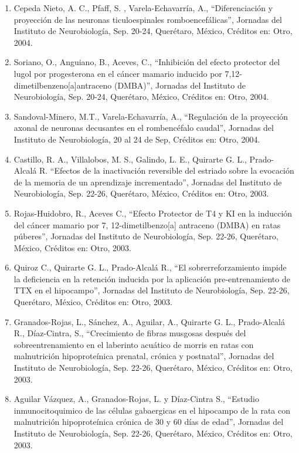 \begin{enumerate}
\item Cepeda Nieto, A. C., Pfaff, S. , Varela-Echavarría, A., “Diferenciación y proyección de las neuronas ticuloespinales romboencefálicas”, 
Jornadas del Instituto de Neurobiología, Sep. 20-24, Querétaro, México, Créditos en: Otro, 2004.

\item Soriano, O., Anguiano, B., Aceves, C., “Inhibición del efecto protector del lugol por progesterona en el cáncer mamario inducido por 
7,12-dimetilbenzeno[a]antraceno (DMBA)”, Jornadas del Instituto de Neurobiología, Sep. 20-24, Querétaro, México, Créditos en: Otro, 2004.

\item Sandoval-Minero, M.T., Varela-Echavarría, A., “Regulación de la proyección axonal de neuronas decusantes en el rombencéfalo caudal”, 
Jornadas 
del Instituto de Neurobiología, 20 al 24 de Sep, Créditos en: Otro, 2004.

\item Castillo, R. A., Villalobos, M. S., Galindo, L. E., Quirarte G. L., Prado-Alcalá R. “Efectos de la inactivación reversible del estriado 
sobre 
la evocación de la memoria de un aprendizaje incrementado”, Jornadas del Instituto de Neurobiología, Sep. 22-26, Querétaro, México, Créditos 
en: Otro, 2003.

\item Rojas-Huidobro, R., Aceves C., “Efecto Protector de T4 y KI en la inducción del cáncer mamario por 7, 12-dimetilbenzo[a] antraceno 
(DMBA) en 
ratas púberes”, Jornadas del Instituto de Neurobiología, Sep. 22-26, Querétaro, México, Créditos en: Otro, 2003.

\item Quiroz C., Quirarte G. L., Prado-Alcalá R., “El sobrerreforzamiento impide la deficiencia en la retención inducida por la aplicación 
pre-entrenamiento de TTX en el hipocampo”, Jornadas del Instituto de Neurobiología, Sep. 22-26, Querétaro, México, Créditos en: Otro, 2003.

\item Granados-Rojas, L., Sánchez, A., Aguilar, A., Quirarte G. L., Prado-Alcalá R., Díaz-Cintra, S., “Crecimiento de fibras musgosas después 
del 
sobreentrenamiento en el laberinto acuático de morris en ratas con malnutrición hipoproteínica prenatal, crónica y postnatal”, Jornadas del 
Instituto de Neurobiología, Sep. 22-26, Querétaro, México, Créditos en: Otro, 2003.

\item Aguilar Vázquez, A., Granados-Rojas, L. y Díaz-Cintra S., “Estudio inmunocitoquimico de las células gabaergicas en el hipocampo de la 
rata 
con malnutrición hipoproteínica crónica de 30 y 60 días de edad”, Jornadas del Instituto de Neurobiología, Sep. 22-26, Querétaro, México, 
Créditos en: Otro, 2003.


\end{enumerate}
